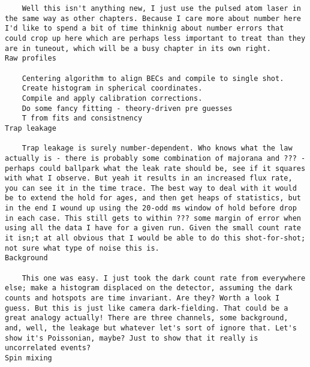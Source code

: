 \begin{verbatim}
    Well this isn't anything new, I just use the pulsed atom laser in the same way as other chapters. Because I care more about number here I'd like to spend a bit of time thinknig about number errors that could crop up here which are perhaps less important to treat than they are in tuneout, which will be a busy chapter in its own right. 
Raw profiles

    Centering algorithm to align BECs and compile to single shot.
    Create histogram in spherical coordinates.
    Compile and apply calibration corrections. 
    Do some fancy fitting - theory-driven pre guesses
    T from fits and consistnency 
Trap leakage

    Trap leakage is surely number-dependent. Who knows what the law actually is - there is probably some combination of majorana and ??? - perhaps could ballpark what the leak rate should be, see if it squares with what I observe. But yeah it results in an increased flux rate, you can see it in the time trace. The best way to deal with it would be to extend the hold for ages, and then get heaps of statistics, but in the end I wound up using the 20-odd ms window of hold before drop in each case. This still gets to within ??? some margin of error when using all the data I have for a given run. Given the small count rate it isn;t at all obvious that I would be able to do this shot-for-shot; not sure what type of noise this is. 
Background

    This one was easy. I just took the dark count rate from everywhere else; make a histogram displaced on the detector, assuming the dark counts and hotspots are time invariant. Are they? Worth a look I guess. But this is just like camera dark-fielding. That could be a great analogy actually! There are three channels, some background, and, well, the leakage but whatever let's sort of ignore that. Let's show it's Poissonian, maybe? Just to show that it really is uncorrelated events?
Spin mixing


\end{verbatim}
